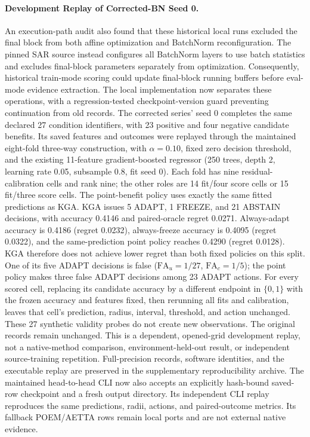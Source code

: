 \paragraph{Development Replay of Corrected-BN Seed 0.}
An execution-path audit also found that these historical local runs excluded
the final block from both affine optimization and BatchNorm reconfiguration.
The pinned SAR source instead configures all BatchNorm layers to use batch
statistics and excludes final-block parameters separately from optimization.
Consequently, historical train-mode scoring could update final-block running
buffers before eval-mode evidence extraction. The local implementation now
separates these operations, with a regression-tested checkpoint-version guard
preventing continuation from old records.
The corrected series' seed 0 completes the same declared 27 condition identifiers,
with 23 positive and four negative candidate benefits. Its saved features and outcomes
were replayed through the maintained eight-fold three-way construction, with
$\alpha=0.10$, fixed zero decision threshold, and the existing 11-feature gradient-boosted
regressor (250 trees, depth 2, learning rate 0.05, subsample 0.8, fit seed 0).
Each fold has nine residual-calibration cells and rank nine; the other roles are
14 fit/four score cells or 15 fit/three score cells. The point-benefit policy uses
exactly the same fitted predictions as KGA. KGA issues 5 ADAPT, 1 FREEZE, and
21 ABSTAIN decisions, with accuracy 0.4146 and paired-oracle regret 0.0271.
Always-adapt accuracy is 0.4186 (regret 0.0232), always-freeze accuracy is
0.4095 (regret 0.0322), and the same-prediction point policy reaches 0.4290
(regret 0.0128). KGA therefore does not achieve lower regret than both fixed policies on this split. One of its five
ADAPT decisions is false ($\mathrm{FA}_u=1/27$, $\mathrm{FA}_c=1/5$); the point
policy makes three false ADAPT decisions among 23 ADAPT actions.
For every scored cell, replacing its candidate accuracy by a different endpoint
in $\{0,1\}$ with the frozen accuracy and features fixed, then rerunning all fits
and calibration, leaves that cell's prediction, radius, interval, threshold, and
action unchanged. These 27 synthetic validity probes do not create new observations.
The original records remain unchanged. This is a dependent, opened-grid development
replay, not a native-method comparison, environment-held-out result, or independent
source-training repetition. Full-precision records, software identities, and the executable
replay are preserved in the supplementary reproducibility archive.
The maintained head-to-head CLI now also accepts an explicitly hash-bound saved-row
checkpoint and a fresh output directory. Its independent CLI replay
reproduces the
same predictions, radii, actions, and paired-outcome metrics. Its fallback POEM/AETTA
rows remain local ports and are not external native evidence.

